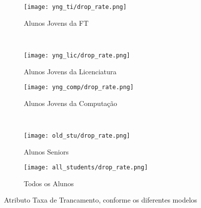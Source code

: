 \clearpage
\begin{figure}[!ht]
    \centering
    \begin{subfigure}[b]{0.48\textwidth}
        \centering
        \texttt{[image: yng\_ti/drop\_rate.png]}
        \caption{Alunos Jovens da FT}
    \end{subfigure}
    ~
    \begin{subfigure}[b]{0.48\textwidth}
        \centering
        \texttt{[image: yng\_lic/drop\_rate.png]}
        \caption{Alunos Jovens da Licenciatura}
    \end{subfigure}

    \begin{subfigure}[b]{0.48\textwidth}
        \centering
        \texttt{[image: yng\_comp/drop\_rate.png]}
        \caption{Alunos Jovens da Computação}
    \end{subfigure}
    ~
    \begin{subfigure}[b]{0.48\textwidth}
        \centering
        \texttt{[image: old\_stu/drop\_rate.png]}
        \caption{Alunos Seniors}
    \end{subfigure}

    \begin{subfigure}[b]{0.48\textwidth}
        \centering
        \texttt{[image: all\_students/drop\_rate.png]}
        \caption{Todos os Alunos}
    \end{subfigure}
    \caption{Atributo Taxa de Trancamento, conforme os diferentes modelos}
\end{figure}

